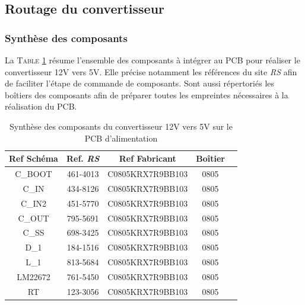 			\newpage
			
			\subsection{Routage du convertisseur}
			
				\subsubsection{Synthèse des composants}
				
				La \textsc{Table \ref{synth_composants}} résume l'ensemble
				des composants à intégrer au PCB pour réaliser le convertisseur
				12V vers 5V. Elle précise notamment les références du site \textit{RS}
				afin de faciliter l'étape de commande de composants. 
				Sont aussi répertoriés les boîtiers des composants afin de préparer
				toutes les empreintes nécessaires à la réalisation du PCB.
				
				\begin{table}[h]
					\begin{center}
						\begin{tabular}{|c|c|c|c|c|}
						\hline
						\textbf{Ref Schéma} & Ref. \textit{RS} & Ref Fabricant & Boîtier \\ 
						\hline
						C\_BOOT & 461-4013 & C0805KRX7R9BB103 & 0805 \\
						\hline
						C\_IN & 434-8126 & C0805KRX7R9BB103 & 0805 \\
						\hline
						C\_IN2 & 451-5770 & C0805KRX7R9BB103 & 0805 \\
						\hline
						C\_OUT & 795-5691 & C0805KRX7R9BB103 & 0805 \\
						\hline
						C\_SS & 698-3425 & C0805KRX7R9BB103 & 0805 \\
						\hline
						D\_1 & 184-1516 & C0805KRX7R9BB103 & 0805 \\
						\hline
						L\_1 & 813-5684 & C0805KRX7R9BB103 & 0805 \\
						\hline
						LM22672 & 761-5450 & C0805KRX7R9BB103 & 0805 \\
						\hline
						RT & 123-3056 & C0805KRX7R9BB103 & 0805 \\
						\hline
						\end{tabular}
					\end{center}
					\caption{Synthèse des composants du convertisseur 12V vers 5V sur le PCB d'alimentation}
					\label{synth_composants}
				\end{table}
				
